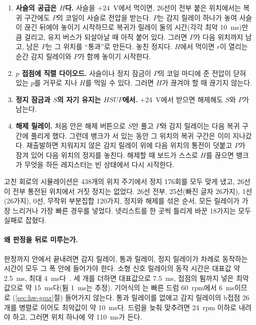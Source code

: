 \begin{enumerate}
\item \textbf{사슬의 공급은 $H$다.} 사슬을 $+24$~V에서 먹이면, 26선이 전부 붙은 위치에서는 복귀 구간에도 $P$의
코일이 사슬로 전압을 받는다. $P$는 감지 릴레이 하나가 놓여 사슬이 끊긴 뒤에야 놓이기 시작하므로 복귀가
릴레이 둘의 시간(각각 최악 10~ms)만큼 걸리고, 유지 버스가 되살아날 때 아직 붙어 있다. 그러면 $P$가 다음
위치까지 남고, 남은 $P$는 그 위치를 ``통과''로 만든다. 놓친 정지다. $H$에서 먹이면 $r$이 열리는 순간 감지
릴레이와 $P$가 함께 놓이기 시작한다.
\item \textbf{$p$ 접점에 직렬 다이오드.} 사슬이나 정지 잠금이 $P$의 코일 마디에 준 전압이 닫혀 있는 $p$를 거꾸로
지나 $H$를 먹일 수 있다. 그러면 $H$가 끊겨야 할 때 끊기지 않는다.
\item \textbf{정지 잠금과 $S$의 자기 유지는 $HSUP$에서.} $+24$~V에서 받으면 해제해도 $S$와 $P$가 남는다.
\item \textbf{해제 릴레이.} 처음 안은 해제 버튼으로 $S$만 풀고 $P$와 감지 릴레이는 다음 복귀 구간에 풀리게
했다. 그런데 뱅크가 서 있는 동안 그 위치의 복귀 구간은 이미 지나갔다. 재출발하면 지워지지 않은 감지 릴레이 위에
다음 위치의 통전이 덧붙고 $P$가 잠겨 있어 다음 위치의 정지를 놓친다. 해제할 때 보드가 스스로 $H$를 끊으면
뱅크가 무엇을 하든 레지스터는 빈 상태에서 다시 시작한다.
\end{enumerate}

고친 회로의 시뮬레이션은 438개의 위치 주기에서 정지 176회를 모두 맞게 냈고, 26선이 전부 통전된 위치에서 거짓
정지는 없었다. 26선 전부, 25선(빠진 글자 26가지), 1선(26가지), 0선, 무작위 부분집합 120가지, 정지와 해제를 섞은
순서, 모든 릴레이가 가장 느리거나 가장 빠른 경우를 넣었다. 넷리스트를 한 곳씩 틀리게 바꾼 18가지는 모두
실패로 잡혔다.

\paragraph{왜 판정을  뒤로 미루는가.} 판정까지  안에서 끝내려면 감지 릴레이,
통과 릴레이, 정지 릴레이가 차례로 동작하는 시간이 모두 그 폭 안에 들어가야 한다. 소형 신호 릴레이의 동작
시간은 대표값 약 2.5~ms, 최대 4~ms다~\cite{omron-g6s}. 세 개를 더하면 대표값으로 7.5~ms, 접점의 튐까지 넣은
최악값으로 약 15~ms다(튐 1~ms는 추정). 기어식의 는 빠른 드럼 60~rpm에서 6~ms이므로
(\ref{sec:hw-gear}절) 들어가지 않는다. 통과 릴레이를 없애고 감지 릴레이의 b접점 26개를 병렬로 이어도
최악값이 약 10~ms다. 드럼을 늦춰 맞추려면 24~rpm 이하로 내려야 하고, 그러면 위치 하나에 약 110~ms가 든다.


